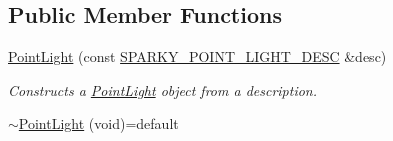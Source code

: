 \subsection*{Public Member Functions}
\begin{DoxyCompactItemize}
\item 
\hyperlink{classsparky_1_1_point_light_ad0fb91a5dfee3959efefc703f364cb4c}{Point\+Light} (const \hyperlink{structsparky_1_1_s_p_a_r_k_y___p_o_i_n_t___l_i_g_h_t___d_e_s_c}{S\+P\+A\+R\+K\+Y\+\_\+\+P\+O\+I\+N\+T\+\_\+\+L\+I\+G\+H\+T\+\_\+\+D\+E\+SC} \&desc)
\begin{DoxyCompactList}\small\item\em Constructs a \hyperlink{classsparky_1_1_point_light}{Point\+Light} object from a description. \end{DoxyCompactList}\item 
\hyperlink{classsparky_1_1_point_light_a048dc877951ef45dd84e725d956e844a}{$\sim$\+Point\+Light} (void)=default\hypertarget{classsparky_1_1_point_light_a048dc877951ef45dd84e725d956e844a}{}\label{classsparky_1_1_point_light_a048dc877951ef45dd84e725d956e844a}


\end{DoxyCompactItemize}
